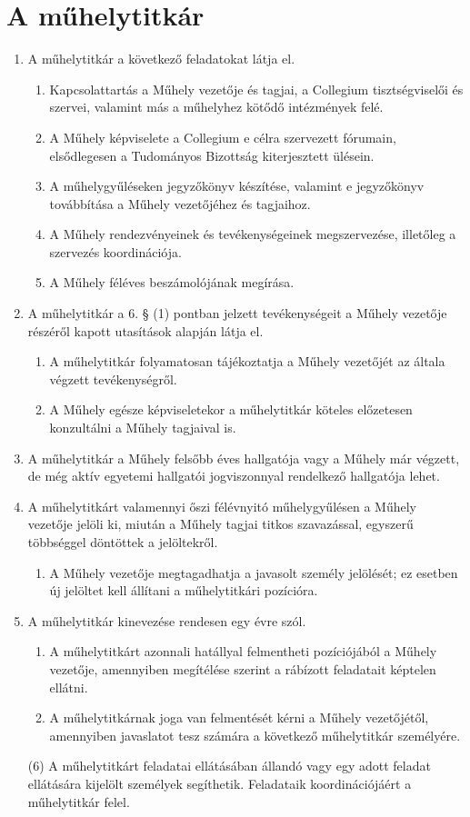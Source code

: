 \documentclass{../styles/rulebook}
\begin{document}
\section{A műhelytitkár}
\begin{enumerate}
	 \item A műhelytitkár a következő feladatokat látja el.
	 \begin{enumerate}
	 	\item  Kapcsolattartás a Műhely vezetője és tagjai, a Collegium tisztségviselői és
	 	szervei, valamint más a műhelyhez kötődő intézmények felé.
	 	\item  A Műhely képviselete a Collegium e célra szervezett fórumain, elsődlegesen a
	 	Tudományos Bizottság kiterjesztett ülésein.
	 	\item  A műhelygyűléseken jegyzőkönyv készítése, valamint e jegyzőkönyv továbbítása a Műhely vezetőjéhez és tagjaihoz.
	 	\item A Műhely rendezvényeinek és tevékenységeinek megszervezése, illetőleg a szervezés koordinációja.
	 	\item  A Műhely féléves beszámolójának megírása.
	 \end{enumerate}
	 \item A műhelytitkár a 6. § (1) pontban jelzett tevékenységeit a Műhely vezetője részéről
	 kapott utasítások alapján látja el. 
	 \begin{enumerate}
	 	\item A műhelytitkár folyamatosan tájékoztatja a Műhely
	 	vezetőjét az általa végzett tevékenységről.
	 	\item A Műhely egésze képviseletekor a műhelytitkár köteles előzetesen konzultálni a Műhely tagjaival is.
	 \end{enumerate}
	 \item A műhelytitkár a Műhely felsőbb éves hallgatója vagy a Műhely már végzett, de még aktív egyetemi hallgatói jogviszonnyal rendelkező hallgatója lehet.
	 \item A műhelytitkárt valamennyi őszi félévnyitó műhelygyűlésen a Műhely vezetője jelöli
	 ki, miután a Műhely tagjai titkos szavazással, egyszerű többséggel döntöttek a jelöltekről. 
	 \begin{enumerate}
	 	\item  A Műhely vezetője megtagadhatja a javasolt személy jelölését; ez esetben
	 	új jelöltet kell állítani a műhelytitkári pozícióra.
	 \end{enumerate}
	 \item A műhelytitkár kinevezése rendesen egy évre szól.
	 \begin{enumerate}
	 	\item A műhelytitkárt azonnali hatállyal felmentheti pozíciójából a Műhely vezetője,
	 	amennyiben megítélése szerint a rábízott feladatait képtelen ellátni.
	 	\item A műhelytitkárnak joga van felmentését kérni a Műhely vezetőjétől, amennyiben
	 	javaslatot tesz számára a következő műhelytitkár személyére.
	 \end{enumerate}
	 (6) A műhelytitkárt feladatai ellátásában állandó vagy egy adott feladat ellátására kijelölt
	 személyek segíthetik. Feladataik koordinációjáért a műhelytitkár felel. 
\end{enumerate}
\end{document}
